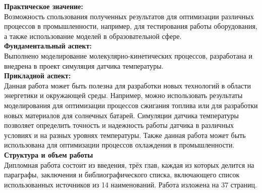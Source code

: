 \indent \textbf{Практическое значение:} \\
\indent Возможность спользования полученных результатов для оптимизации различных процессов в промышленности, например, для тестирования работы оборудования, а также использование моделей в образовательной сфере.\\

\indent \textbf{Фундаментальный аспект:} \\
\indent Выполнено моделирование молекулярно-кинетических процессов, разработана и внедрена в проект симуляция датчика температуры. \\

\indent \textbf{Прикладной аспект:} \\
\indent Данная работа может быть полезна для разработки новых технологий в области энергетики и окружающей среды. Например, можно использовать результаты моделирования для оптимизации процессов сжигания топлива или для разработки новых материалов для солнечных батарей. Симуляции датчика температуры позволяет определить точность и надежность работы датчика в различных условиях и на разных уровнях температуры. Также данная работа может быть использована для оптимизации процессов охлаждения в промышленности. \\

\noindent \textbf{Структура и объем работы} \\
\indent Дипломная работа состоит из введения, трёх глав, каждая из которых делится на параграфы, заключения и библиографического списка, включающего список использованных источников из 14 наименований. Работа изложена на 37 страниц.



